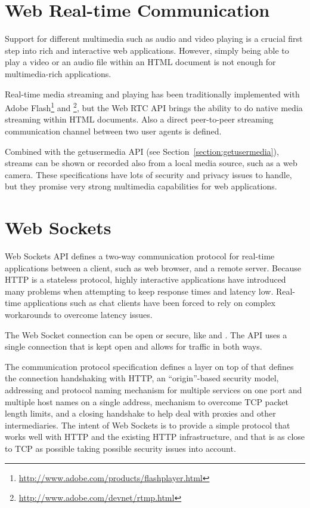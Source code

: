 \section{Web Real-time Communication}

Support for different multimedia such as audio and video playing is a
crucial first step into rich and interactive web
applications. However, simply being able to play a video or an audio
file within an HTML document is not enough for multimedia-rich
applications.

Real-time media streaming and playing has been traditionally
implemented with Adobe
Flash\footnote{\url{http://www.adobe.com/products/flashplayer.html}}
and \footnote{\url{http://www.adobe.com/devnet/rtmp.html}},
but the Web RTC API \cite{WebRTC} brings the ability to do native
media streaming within HTML documents. Also a direct peer-to-peer
streaming communication channel between two user agents is defined.

Combined with the getusermedia API \cite{getusermedia} (see
Section~\ref{section:getusermedia}), streams can be shown or recorded
also from a local media source, such as a web camera. These
specifications have lots of security and privacy issues to handle, but
they promise very strong multimedia capabilities for web applications.

\section{Web Sockets}

Web Sockets API \cite{WebSockets, WebSocketProtocol} defines a two-way
communication protocol for real-time applications between a client,
such as web browser, and a remote server. Because HTTP is a stateless
protocol, highly interactive applications have introduced many
problems when attempting to keep response times and latency
low. Real-time applications such as chat clients have been forced to
rely on complex workarounds to overcome latency issues.

The Web Socket connection can be open or secure, like  and
. The API uses a single  connection that is kept
open and allows for traffic in both ways. \cite{WebSockets,
  WebSocketProtocol}

The communication protocol specification defines a layer on top of
 that defines the connection handshaking with HTTP, an
``origin''-based security model, addressing and protocol naming
mechanism for multiple services on one port and multiple host names on
a single  address, mechanism to overcome TCP packet length
limits, and a closing handshake to help deal with proxies and other
intermediaries. The intent of Web Sockets is to provide a simple
protocol that works well with HTTP and the existing HTTP
infrastructure, and that is as close to TCP as possible taking
possible security issues into account. \cite{WebSocketProtocol}

